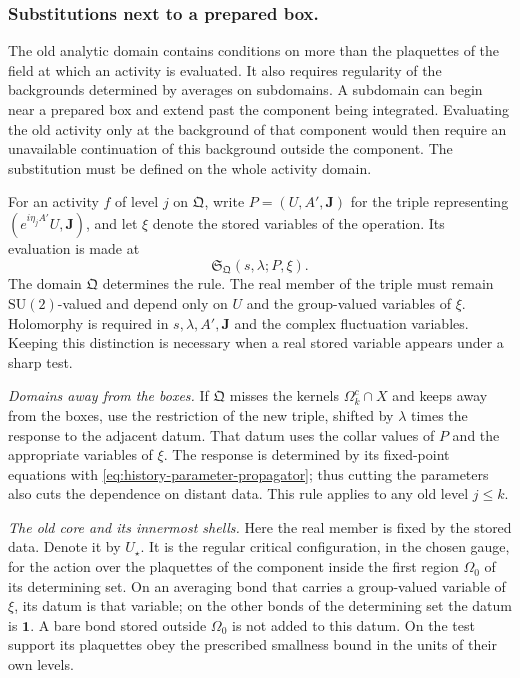\documentclass[11pt,letterpaper,reqno]{amsart}
\theoremstyle{definition}
\theoremstyle{remark}
\newcommand{\SU}{\mathrm{SU}}
\begin{document}
\subsubsection*{Substitutions next to a prepared box.}

The old analytic domain contains conditions on more than the
plaquettes of the field at which an activity is evaluated. It also
requires regularity of the backgrounds determined by averages on
subdomains. A subdomain can begin near a prepared box and extend
past the component being integrated. Evaluating the old activity
only at the background of that component would then require an
unavailable continuation of this background outside the component.
The substitution must be defined on the whole activity domain.

For an activity $f$ of level $j$ on $\mathfrak Q$, write
$P=(U,A',\mathbf J)$ for the triple representing
$(e^{i\eta_jA'}U,\mathbf J)$, and let $\xi$ denote the stored
variables of the operation. Its evaluation is made at
\[
 \mathfrak S_{\mathfrak Q}(s,\lambda;P,\xi).
\]
The domain $\mathfrak Q$ determines the rule. The real member of
the triple must remain $\SU(2)$-valued and depend only on $U$ and
the group-valued variables of $\xi$. Holomorphy is required in
$s,\lambda,A',\mathbf J$ and the complex fluctuation variables.
Keeping this distinction is necessary when a real stored variable
appears under a sharp test.

\emph{Domains away from the boxes.}
If $\mathfrak Q$ misses the kernels $\Omega_k^c\cap X$ and keeps
away from the boxes, use the restriction of the new triple,
shifted by $\lambda$ times the response to the adjacent datum.
That datum uses the collar values of $P$ and the appropriate
variables of $\xi$. The response is determined by its fixed-point
equations with \eqref{eq:history-parameter-propagator}; thus
cutting the parameters also cuts the dependence on distant data.
This rule applies to any old level $j\le k$.

\emph{The old core and its innermost shells.}
Here the real member is fixed by the stored data. Denote it by
$U_\star$. It is the regular critical configuration, in the
chosen gauge, for the action over the plaquettes of the component
inside the first region $\Omega_0$ of its determining set.
On an averaging bond that carries a group-valued variable of
$\xi$, its datum is that variable; on the other bonds of the
determining set the datum is $\mathbf1$. A bare bond stored outside
$\Omega_0$ is not added to this datum. On the test support its
plaquettes obey the prescribed smallness bound in the units of
their own levels.
\end{document}
